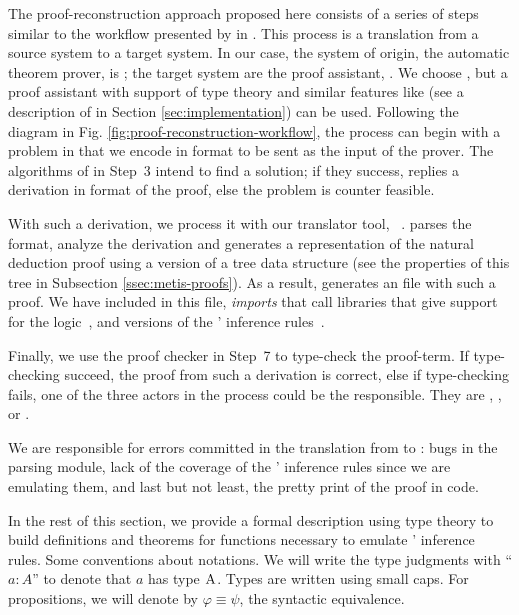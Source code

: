 \documentclass[../main.tex]{subfiles}
\begin{document}
The proof-reconstruction approach proposed here consists of a series
of steps similar to the workflow presented by \citeauthor{sultana2015} in
\cite{sultana2015}. This process is a translation from a source
system to a target system. In our case, the system of origin, the
automatic theorem prover, is \Metis; the target system are the proof
assistant, \Agda. We choose \Agda, but a proof assistant with
support of type theory and similar features like \Agda
(see a description of \Agda in Section
\ref{sec:implementation}) can be used.
Following the diagram in Fig.
\ref{fig:proof-reconstruction-workflow}, the process can begin with
a problem in \CPL that we encode in \TPTP format to be sent as the
input of the \Metis prover.
The algorithms of \Metis in Step~3 intend to find
a solution; if they success, \Metis replies a derivation in \TSTP
format of the proof, else the problem is counter feasible.

With such a derivation, we process it with our \Haskell translator
tool, \Athena~\cite{Athena}.
\Athena parses the \TSTP format, analyze the
derivation and generates a representation of the natural deduction
proof using a version of a tree data structure (see the properties
of this tree in Subsection \ref{ssec:metis-proofs}). As a result,
\Athena generates an \Agda file with such a proof. We have included
in this file, \emph{imports} that call \Agda libraries that give
support for the logic~\cite{AgdaProp}, and versions of the \Metis'
inference rules~\cite{AgdaMetis}.

Finally, we use the proof checker in Step~7 to type-check the
proof-term. If type-checking succeed, the proof from such a \TSTP
derivation is correct, else if type-checking fails, one of the three
actors in the process could be the responsible.
They are \Metis, \Athena, or \Agda.

We are responsible for errors committed in the translation from
\TSTP to \Agda: bugs in the parsing module, lack of the coverage of
the \Metis' inference rules since we are emulating them, and last
but not least, the pretty print of the proof in \Agda code.

In the rest of this section, we provide a formal description using
type theory to build definitions and theorems for functions
necessary to emulate \Metis' inference rules.
Some conventions about notations. We will write the
type judgments with ``$a : A$'' to denote that $a$ has type
$\textsc{A}$. Types are written using small caps.
For propositions, we will denote by $φ ≡ ψ$, the syntactic
equivalence.
\end{document}
